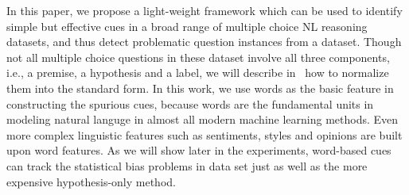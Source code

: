 
In this paper, we propose a light-weight framework
which can be used to identify simple but effective cues 
in a broad range of multiple choice NL reasoning datasets, and thus
detect problematic question instances from a dataset. 
Though not all multiple choice questions in these dataset involve 
all three components, i.e., a premise, a hypothesis and a label, 
we will describe in~ how to normalize them into
the standard form. In this work, we use words as the basic feature in 
constructing the spurious cues, because words are the fundamental units in
modeling natural languge in almost all modern machine learning methods.
Even more complex linguistic features such as sentiments, styles and opinions 
are built upon word features. As we will show later in the experiments,
word-based cues can track the statistical bias problems in
data set just as well as the more expensive hypothesis-only method.

